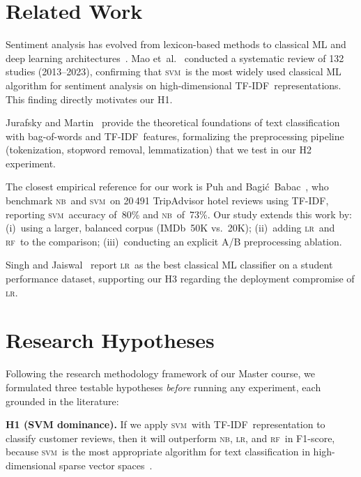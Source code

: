 \documentclass[conference]{IEEEtran}
\newcommand{\LR}{\textsc{lr}}
\newcommand{\SVM}{\textsc{svm}}
\newcommand{\NB}{\textsc{nb}}
\newcommand{\RF}{\textsc{rf}}
\newcommand{\TFIDF}{TF-IDF}
\begin{document}
\section{Related Work}

Sentiment analysis has evolved from lexicon-based methods to
classical ML and deep learning architectures~\cite{mao2024,singh2023}.
Mao et~al.~\cite{mao2024} conducted a systematic review of 132
studies (2013--2023), confirming that \SVM\ is the most widely
used classical ML algorithm for sentiment analysis on
high-dimensional \TFIDF\ representations.
This finding directly motivates our H1.

Jurafsky and Martin~\cite{jurafsky2023} provide the theoretical
foundations of text classification with bag-of-words and \TFIDF\
features, formalizing the preprocessing pipeline
(tokenization, stopword removal, lemmatization) that we test in
our H2 experiment.

The closest empirical reference for our work is Puh and
Bagi\'c~Babac~\cite{puh2023}, who benchmark \NB\ and \SVM\ on
20\,491 TripAdvisor hotel reviews using \TFIDF, reporting \SVM\
accuracy of~80\% and \NB\ of~73\%.
Our study extends this work by: (i)~using a larger, balanced
corpus (IMDb~50K vs.\ 20K); (ii)~adding \LR\ and \RF\ to the
comparison; (iii)~conducting an explicit A/B preprocessing
ablation.

Singh and Jaiswal~\cite{singh2023} report \LR\ as the best
classical ML classifier on a student performance dataset,
supporting our H3 regarding the deployment compromise of \LR.

\section{Research Hypotheses}

Following the research methodology framework of our Master course,
we formulated three testable hypotheses \emph{before} running any
experiment, each grounded in the literature:

\textbf{H1 (SVM dominance).}
If we apply \SVM\ with \TFIDF\ representation to classify customer
reviews, then it will outperform \NB, \LR, and \RF\ in F1-score,
because \SVM\ is the most appropriate algorithm for text
classification in high-dimensional sparse vector
spaces~\cite{mao2024,puh2023}.
\end{document}
